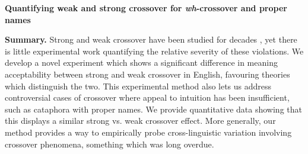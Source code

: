 \documentclass[12pt,letterpaper]{article}
\newcommand{\sectitle}[1]{\smallskip \textbf{#1.}}
\begin{document}
\begin{center}
\textbf{Quantifying weak and strong crossover for \emph{wh}-crossover and proper names}
\end{center}
\vspace*{-0.5em}

\sectitle{Summary} Strong and weak crossover
have been studied for decades \citep{postal1971cross}, %
yet there is little experimental work quantifying the relative severity of these violations. We develop a novel experiment which shows a significant difference in meaning acceptability between strong and weak crossover in English, favouring theories which distinguish the two.
This %
experimental method also lets us %
address controversial cases of crossover where appeal to intuition has been insufficient, such as cataphora with proper names. We provide quantitative data showing that this displays a similar strong vs. weak crossover effect. More generally, our method provides a way to empirically probe cross-linguistic variation involving crossover phenomena, something which was long overdue.
\end{document}
